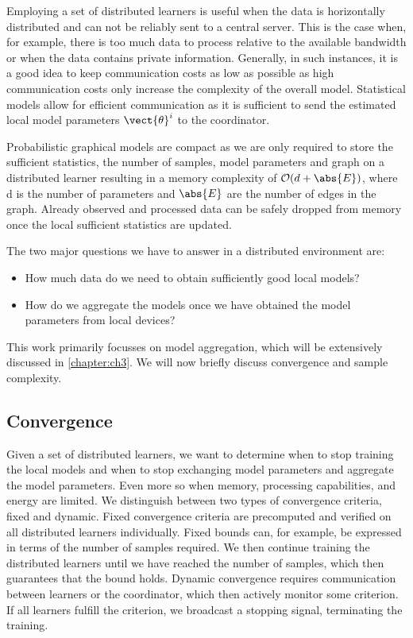 Employing a set of distributed learners is useful when the data is horizontally distributed and can not be reliably sent to a central server.
This is the case when, for example, there is too much data to process relative to the available bandwidth or when the data contains private information.
Generally, in such instances, it is a good idea to keep communication costs as low as possible as high communication costs only increase the complexity of the overall model.
Statistical models allow for efficient communication as it is sufficient to send the estimated local model parameters $\vect{\theta}^i$ to the coordinator. 

Probabilistic graphical models are compact as we are only required to store the sufficient statistics, the number of samples, model parameters and graph on a distributed learner resulting in a memory complexity of $\mathcal{O}(d + \abs{E})$, where d is the number of parameters and $\abs{E}$ are the number of edges in the graph. 
Already observed and processed data can be safely dropped from memory once the local sufficient statistics are updated.

The two major questions we have to answer in a distributed environment are:
\begin{itemize}
    \item How much data do we need to obtain sufficiently good local models?
    \item How do we aggregate the models once we have obtained the model parameters from local devices?
\end{itemize}

This work primarily focusses on model aggregation, which will be extensively discussed in \autoref{chapter:ch3}. 
We will now briefly discuss convergence and sample complexity.

\subsection{Convergence}
Given a set of distributed learners, we want to determine when to stop training the local models and when to stop exchanging model parameters and aggregate the model parameters.
Even more so when memory, processing capabilities, and energy are limited.
We distinguish between two types of convergence criteria, fixed and dynamic.
Fixed convergence criteria are precomputed and verified on all distributed learners individually.
Fixed bounds can, for example, be expressed in terms of the number of samples required. 
We then continue training the distributed learners until we have reached the number of samples, which then guarantees that the bound holds.
Dynamic convergence requires communication between learners or the coordinator, which then actively monitor some criterion.
If all learners fulfill the criterion, we broadcast a stopping signal, terminating the training.

